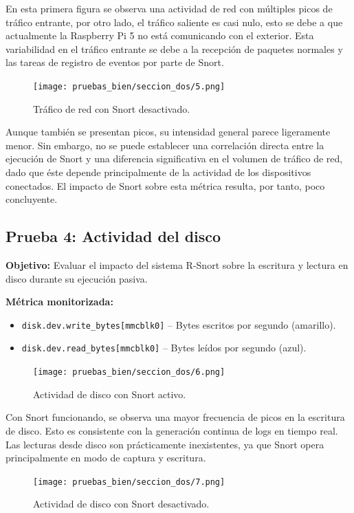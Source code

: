 \documentclass[11pt,a4paper,twoside]{report}
\begin{document}
En esta primera figura se observa una actividad de red con múltiples picos de tráfico entrante, por otro lado, el tráfico saliente es casi nulo, esto se debe a que actualmente la Raspberry Pi 5 no está comunicando con el exterior. Esta variabilidad en el tráfico entrante se debe a la recepción de paquetes normales y las tareas de registro de eventos por parte de Snort.

\begin{figure}[H] \centering \texttt{[image: pruebas\_bien/seccion\_dos/5.png]} \caption{Tráfico de red con Snort desactivado.} \end{figure}

Aunque también se presentan picos, su intensidad general parece ligeramente menor. Sin embargo, no se puede establecer una correlación directa entre la ejecución de Snort y una diferencia significativa en el volumen de tráfico de red, dado que éste depende principalmente de la actividad de los dispositivos conectados. El impacto de Snort sobre esta métrica resulta, por tanto, poco concluyente.

\subsection*{Prueba 4: Actividad del disco}

\textbf{Objetivo:}  
Evaluar el impacto del sistema R-Snort sobre la escritura y lectura en disco durante su ejecución pasiva.\newline

\textbf{Métrica monitorizada:}
\begin{itemize}
	\item \texttt{disk.dev.write\_bytes[mmcblk0]} – Bytes escritos por segundo (amarillo).
	\item \texttt{disk.dev.read\_bytes[mmcblk0]} – Bytes leídos por segundo (azul).
\end{itemize}

\begin{figure}[H]
	\centering
	\texttt{[image: pruebas\_bien/seccion\_dos/6.png]}
	\caption{Actividad de disco con Snort activo.}
\end{figure}

Con Snort funcionando, se observa una mayor frecuencia de picos en la escritura de disco. Esto es consistente con la generación continua de logs en tiempo real. Las lecturas desde disco son prácticamente inexistentes, ya que Snort opera principalmente en modo de captura y escritura.

\begin{figure}[H]
	\centering
	\texttt{[image: pruebas\_bien/seccion\_dos/7.png]}
	\caption{Actividad de disco con Snort desactivado.}
\end{figure}
\end{document}
